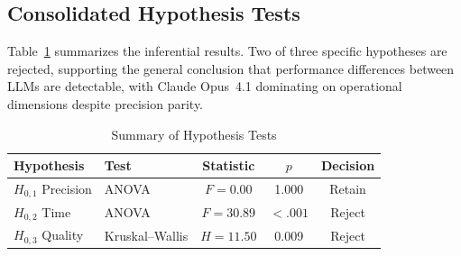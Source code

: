 \documentclass[twocolumn,11pt]{article}
\begin{document}
    \subsection{Consolidated Hypothesis Tests}
    Table~\ref{tab:hypotheses} summarizes the inferential results. Two of three specific hypotheses are rejected, supporting the general conclusion that performance differences between LLMs are detectable, with Claude Opus~4.1 dominating on operational dimensions despite precision parity.
    \begin{table}[!t]
    \caption{Summary of Hypothesis Tests}\label{tab:hypotheses}
    \centering\small
    \begin{tabular}{@{}llccc@{}}\toprule
    Hypothesis & Test & Statistic & $p$ & Decision \\\midrule
    $H_{0,1}$ Precision & ANOVA & $F = 0.00$ & 1.000 & Retain \\
    $H_{0,2}$ Time & ANOVA & $F = 30.89$ & $<.001$ & Reject \\
    $H_{0,3}$ Quality & Kruskal--Wallis & $H = 11.50$ & 0.009 & Reject \\\bottomrule
    \end{tabular}
    \end{table}
\end{document}
